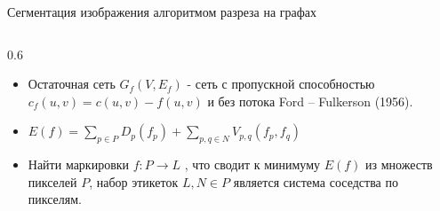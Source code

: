 \documentclass[10pt,pdf,hyperref={unicode},xcolor=table]{beamer}
\begin{document}
\begin{frame}{Сегментация изображения алгоритмом разреза на графах}
\begin{columns}
\begin{column} {0.6\textwidth}
\begin{block}{}
\begin{itemize}
	\item Остаточная сеть $G_f\left(V,E_f\right)$ - сеть с  пропускной способностью $c_f\left(u,v\right)=c\left(u,v\right)-f\left(u,v\right)$ и без потока Ford – Fulkerson (1956).
\item $E\left(f\right) = \sum_{p \in P}D_p\left(f_p\right)+\sum_{p,q \in N}V_{p,q}\left(f_p,f_q\right)$
\item Найти маркировки $f:P\rightarrow L$ , что сводит к минимуму $E\left(f\right)$ из множеств пикселей $P$, набор этикеток $L,N \in P$ является система соседства по пикселям. 
	\end{itemize}
	\end{block}
			\end{column}      
		\end{columns}
	
\end{frame}
\end{document}
